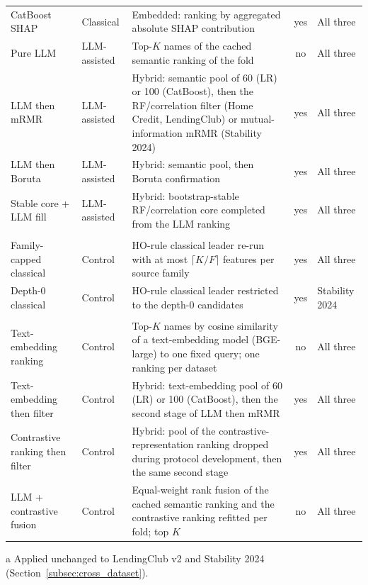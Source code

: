 \documentclass[final,5p,twocolumn]{elsarticle}
\newcommand{\Kfeat}{K}
\begin{document}
\begin{table}[htbp]
\begin{threeparttable}
\begin{tabular}{@{}llL{46mm}cl@{}}
CatBoost SHAP & Classical & Embedded: ranking by aggregated absolute SHAP contribution & yes & All three \\
Pure LLM & LLM-assisted & Top-$\Kfeat$ names of the cached semantic ranking of the fold & no & All three \\
LLM then mRMR & LLM-assisted & Hybrid: semantic pool of 60 (LR) or 100 (CatBoost), then the RF/correlation filter (Home Credit, LendingClub) or mutual-information mRMR (Stability 2024) & yes & All three \\
LLM then Boruta & LLM-assisted & Hybrid: semantic pool, then Boruta confirmation & yes & All three \\
Stable core + LLM fill & LLM-assisted & Hybrid: bootstrap-stable RF/correlation core completed from the LLM ranking & yes & All three \\
\addlinespace
{} \\
Family-capped classical & Control & HO-rule classical leader re-run with at most $\lceil \Kfeat/F\rceil$ features per source family & yes & All three \\
Depth-0 classical & Control & HO-rule classical leader restricted to the depth-0 candidates & yes & Stability 2024 \\
\addlinespace
{} \\
Text-embedding ranking & Control & Top-$\Kfeat$ names by cosine similarity of a text-embedding model (BGE-large) to one fixed query; one ranking per dataset & no & All three \\
Text-embedding then filter & Control & Hybrid: text-embedding pool of 60 (LR) or 100 (CatBoost), then the second stage of LLM then mRMR & yes & All three \\
Contrastive ranking then filter & Control & Hybrid: pool of the contrastive-representation ranking dropped during protocol development, then the same second stage & yes & All three \\
LLM + contrastive fusion & Control & Equal-weight rank fusion of the cached semantic ranking and the contrastive ranking refitted per fold; top $\Kfeat$ & no & All three \\
\bottomrule
\end{tabular}
\begin{tablenotes}\footnotesize
\item[a] Applied unchanged to LendingClub v2 and Stability 2024 (Section~\ref{subsec:cross_dataset}).

\end{tablenotes}
\end{threeparttable}
\end{table}
\end{document}
